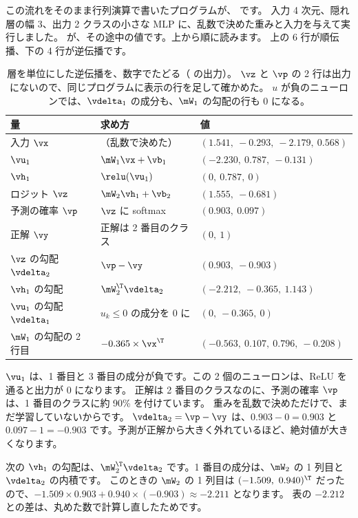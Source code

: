 この流れをそのまま行列演算で書いたプログラムが、 です。
入力 4 次元、隠れ層の幅 3、出力 2 クラスの小さな MLP に、乱数で決めた重みと入力を与えて実行しました。
が、その途中の値です。上から順に読みます。
上の 6 行が順伝播、下の 4 行が逆伝播です。

\begin{table}[tbp]
\centering
\caption{層を単位にした逆伝播を、数字でたどる（ の出力）。
$\vz$ と $\vp$ の 2 行は出力にないので、同じプログラムに表示の行を足して確かめた。
$u$ が負のニューロンでは、$\vdelta_1$ の成分も、$\mW_1$ の勾配の行も 0 になる。}
\label{tab:nn-layer-numbers}
\small
\begin{tabular}{lll}
\toprule
量 & 求め方 & 値 \\
\midrule
入力 $\vx$ & （乱数で決めた） & $(1.541,\ -0.293,\ -2.179,\ 0.568)$ \\
$\vu_1$ & $\mW_1\vx+\vb_1$ & $(-2.230,\ 0.787,\ -0.131)$ \\
$\vh_1$ & $\relu(\vu_1)$ & $(0,\ 0.787,\ 0)$ \\
ロジット $\vz$ & $\mW_2\vh_1+\vb_2$ & $(1.555,\ -0.681)$ \\
予測の確率 $\vp$ & $\vz$ に softmax & $(0.903,\ 0.097)$ \\
正解 $\vy$ & 正解は 2 番目のクラス & $(0,\ 1)$ \\
\midrule
$\vz$ の勾配 $\vdelta_2$ & $\vp-\vy$ & $(0.903,\ -0.903)$ \\
$\vh_1$ の勾配 & $\mW_2^\T\vdelta_2$ & $(-2.212,\ -0.365,\ 1.143)$ \\
$\vu_1$ の勾配 $\vdelta_1$ & $u_k\le 0$ の成分を 0 に & $(0,\ -0.365,\ 0)$ \\
$\mW_1$ の勾配の 2 行目 & $-0.365\times\vx^\T$ & $(-0.563,\ 0.107,\ 0.796,\ -0.208)$ \\
\bottomrule
\end{tabular}
\end{table}

$\vu_1$ は、1 番目と 3 番目の成分が負です。この 2 個のニューロンは、ReLU を通ると出力が 0 になります。
正解は 2 番目のクラスなのに、予測の確率 $\vp$ は、1 番目のクラスに約 90\% を付けています。
重みを乱数で決めただけで、まだ学習していないからです。
$\vdelta_2=\vp-\vy$ は、$0.903-0=0.903$ と $0.097-1=-0.903$ です。予測が正解から大きく外れているほど、絶対値が大きくなります。

次の $\vh_1$ の勾配は、$\mW_2^\T\vdelta_2$ です。1 番目の成分は、$\mW_2$ の 1 列目と $\vdelta_2$ の内積です。
このときの $\mW_2$ の 1 列目は $(-1.509,\ 0.940)^\T$ だったので、$-1.509\times 0.903+0.940\times(-0.903)\approx-2.211$ となります。
表の $-2.212$ との差は、丸めた数で計算し直したためです。

